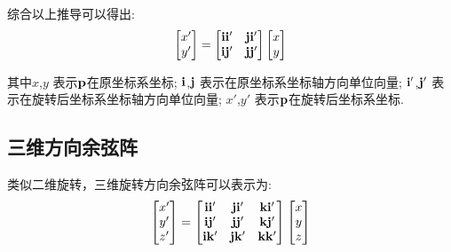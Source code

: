 综合以上推导可以得出:
\begin{equation}\label{二维方向余弦阵}
    \begin{split}
        \left[\begin{matrix}
                x' \\
                y'
        \end{matrix}\right]
        =
        \left[\begin{matrix}
                \mathbf{i}\mathbf{i}' & \mathbf{j}\mathbf{i}' \\
                \mathbf{i}\mathbf{j}' & \mathbf{j}\mathbf{j}'
        \end{matrix}\right]
        \left[\begin{matrix}
                x \\
                y
        \end{matrix}\right]
    \end{split}
\end{equation}

其中$x$,$y$     表示$\mathbf{p}$在原坐标系坐标;
$\mathbf{i}$,$\mathbf{j}$   表示在原坐标系坐标轴方向单位向量;
$\mathbf{i}'$,$\mathbf{j}'$ 表示在旋转后坐标系坐标轴方向单位向量;
$x'$,$y'$       表示$\mathbf{p}$在旋转后坐标系坐标.
\subsection{三维方向余弦阵}
类似二维旋转，三维旋转方向余弦阵可以表示为:
\begin{equation}\label{三维方向余弦阵}
    \begin{split}
        \left[\begin{matrix}
                x' \\
                y' \\
                z'
        \end{matrix}\right]
        =
        \left[\begin{matrix}
                \mathbf{i}\mathbf{i}' & \mathbf{j}\mathbf{i}' & \mathbf{k}\mathbf{i}' \\
                \mathbf{i}\mathbf{j}' & \mathbf{j}\mathbf{j}' & \mathbf{k}\mathbf{j}' \\
                \mathbf{i}\mathbf{k}' & \mathbf{j}\mathbf{k}' & \mathbf{k}\mathbf{k}'
        \end{matrix}\right]
        \left[\begin{matrix}
                x \\
                y \\
                z
        \end{matrix}\right]
    \end{split}
\end{equation}

